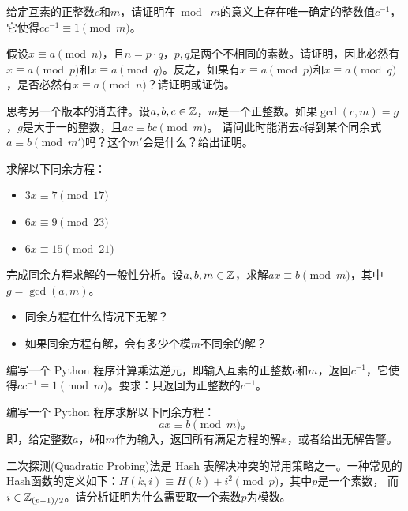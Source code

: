\begin{problemset}
 \item 给定互素的正整数$c$和$m$，请证明在$\bmod \; m$的意义上存在唯一确定的整数值$c^{-1}$，它使得$c c^{-1} \equiv 1 \pmod{m}$。
 
 \item 假设$x \equiv a \pmod{n}$，且$n = p \cdot q$，$p, q$是两个不相同的素数。请证明，因此必然有$x \equiv a \pmod{p}$和$x \equiv a \pmod{q}$。反之，如果有$x \equiv a \pmod{p}$和$x \equiv a \pmod{q}$，是否必然有$x \equiv a \pmod{n}$？请证明或证伪。
 
 \item 思考另一个版本的消去律。设$a, b, c \in {\mathbb Z}$，$m$是一个正整数。如果$\gcd(c, m) = g$，$g$是大于一的整数，且$ac \equiv bc \pmod{m}$。
 请问此时能消去$c$得到某个同余式$a \equiv b \pmod{m'}$吗？这个$m'$会是什么？给出证明。%
 
 \item 求解以下同余方程：
  \begin{itemize}
  \item $3x \equiv 7 \pmod{17}$  %
  
  \item $6x \equiv 9 \pmod{23}$  %
  
  \item $6x \equiv 15 \pmod{21}$  %
  \end{itemize}
 
 \item 完成同余方程求解的一般性分析。设$a, b, m\in {\mathbb Z}$，求解$a x \equiv b \pmod{m}$，其中$g = \gcd(a,m)$。

 \begin{itemize}
 \item 同余方程在什么情况下无解？
 
 \item 如果同余方程有解，会有多少个模$m$不同余的解？
 \end{itemize}
  
 \item 编写一个 Python 程序计算乘法逆元，即输入互素的正整数$c$和$m$，返回$c^{-1}$，它使得$c c^{-1} \equiv 1 \pmod{m}$。要求：只返回为正整数的$c^{-1}$。
  
  \item 编写一个 Python 程序求解以下同余方程：
     \[ a x \equiv b \pmod{m}\text{。} \]
    即，给定整数$a$，$b$和$m$作为输入，返回所有满足方程的解$x$，或者给出无解告警。
   
  \item 二次探测(Quadratic Probing)法是 Hash 表解决冲突的常用策略之一。一种常见的Hash函数的定义如下：$H(k,i) \equiv H(k) + i^2 \pmod{p}$，其中$p$是一个素数，
  而$i\in {\mathbb Z}_{(p-1)/2}$。请分析证明为什么需要取一个素数$p$为模数。%
    

\end{problemset}
